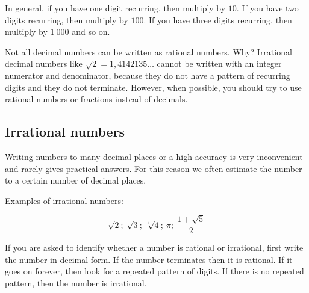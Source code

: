 In general, if you have one digit recurring, then multiply by $10$. If
you have two digits recurring, then multiply by $100$. If you have
three digits recurring, then multiply by $1~000$ and so on.\par

Not all decimal numbers can be written as rational numbers. Why? Irrational decimal numbers like 
$\sqrt{2}=1,4142135\ldots$
cannot be written with an integer numerator and denominator, because they do not have a pattern of recurring digits and they do not terminate. However, when possible, you should try to use rational numbers or fractions instead of decimals.




\subsection{Irrational numbers}
\setcounter{figure}{1}
\setcounter{subfigure}{1}


Writing numbers to many decimal places or a high accuracy is very inconvenient and rarely gives practical answers. For this reason we often estimate the number to a certain number of decimal places.\par 


Examples of irrational numbers:\par 

\begin{equation*}
\sqrt{2};~\sqrt{3};~\sqrt[3]{4};~\pi ;
~\frac{1+\sqrt{5}}{2}
\end{equation*}


If you are asked to identify whether a number is rational or
irrational, first write the number in decimal form. If the number
terminates then it is rational. If it goes on forever, then look for a
repeated pattern of digits. If there is no repeated pattern, then the
number is irrational.

